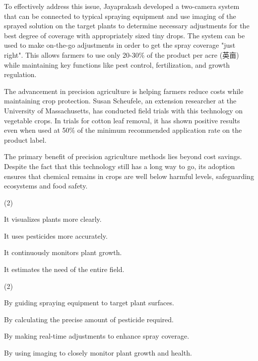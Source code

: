 \documentclass{英语试卷}
\begin{document}
\par To effectively address this issue, Jayaprakash developed a two-camera system that can be connected to typical spraying equipment and use imaging of the sprayed solution on the target plants to determine necessary adjustments for the best degree of coverage with appropriately sized tiny drops. The system can be used to make on-the-go adjustments in order to get the spray coverage "just right". This allows farmers to use only 20-30\% of the product per acre (英亩) while maintaining key functions like pest control, fertilization, and growth regulation.\par
\par The advancement in precision agriculture is helping farmers reduce costs while maintaining crop protection. Susan Scheufele, an extension researcher at the University of Massachusetts, has conducted field trials with this technology on vegetable crops. In trials for cotton leaf removal, it has shown positive results even when used at 50\% of the minimum recommended application rate on the product label.\par
\par The primary benefit of precision agriculture methods lies beyond cost savings. Despite the fact that this technology still has a long way to go, its adoption ensures that chemical remains in crops are well below harmful levels, safeguarding ecosystems and food safety.\par
{}
\begin{choices}(2)
  \item It visualizes plants more clearly.
  \item It uses pesticides more accurately.
  \item It continuously monitors plant growth.
  \item It estimates the need of the entire field.
\end{choices}
\begin{choices}(2)
  \item By guiding spraying equipment to target plant surfaces.
  \item By calculating the precise amount of pesticide required.
  \item By making real-time adjustments to enhance spray coverage.
  \item By using imaging to closely monitor plant growth and health.
\end{choices}
\end{document}
